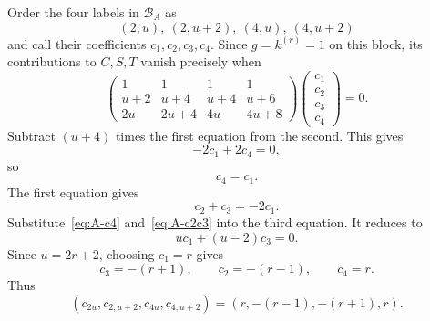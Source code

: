 \documentclass[11pt]{article}
\theoremstyle{definition}
\begin{document}
Order the four labels in $\mathcal B_A$ as
\[
(2,u),\ (2,u+2),\ (4,u),\ (4,u+2)
\]
and call their coefficients $c_1,c_2,c_3,c_4$.  Since $g=k^{(r)}=1$ on this block, its contributions to $C,S,T$ vanish precisely when
\begin{equation}
\begin{pmatrix}
1&1&1&1\\
u+2&u+4&u+4&u+6\\
2u&2u+4&4u&4u+8
\end{pmatrix}
\begin{pmatrix}c_1\\c_2\\c_3\\c_4\end{pmatrix}=0.
\label{eq:blockA-system}
\end{equation}
Subtract $(u+4)$ times the first equation from the second.  This gives
\[
-2c_1+2c_4=0,
\]
so
\begin{equation}
c_4=c_1.
\label{eq:A-c4}
\end{equation}
The first equation gives
\begin{equation}
c_2+c_3=-2c_1.
\label{eq:A-c2c3}
\end{equation}
Substitute~\eqref{eq:A-c4} and~\eqref{eq:A-c2c3} into the third equation.  It reduces to
\[
u c_1+(u-2)c_3=0.
\]
Since $u=2r+2$, choosing $c_1=r$ gives
\[
c_3=-(r+1),
\qquad
c_2=-(r-1),
\qquad
c_4=r.
\]
Thus
\begin{equation}
\boxed{
(c_{2u},c_{2,u+2},c_{4u},c_{4,u+2})
=(r,-(r-1),-(r+1),r).
}
\label{eq:blockA-coeff}
\end{equation}
\end{document}
